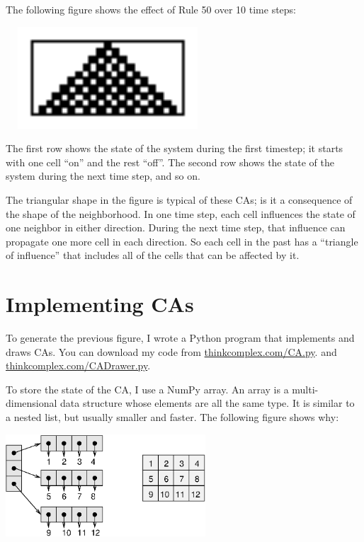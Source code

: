 \documentclass[10pt]{book}
\begin{document}
The following figure shows the effect of Rule 50 over 10
time steps:

\beforefig
\centerline{\includegraphics[width=3.0in,height=1.5in]{figs/rule50.eps}}
\afterfig

The first row shows the state of the system during the first
timestep; it starts with one cell ``on'' and the rest ``off''.
The second row shows the state of the system during the
next time step, and so on.

The triangular shape in the figure is typical of these CAs; is it a
consequence of the shape of the neighborhood.  In one time step, each
cell influences the state of one neighbor in either direction.  During
the next time step, that influence can propagate one more cell in each
direction.  So each cell in the past has a ``triangle of influence''
that includes all of the cells that can be affected by it.


\section{Implementing CAs}

To generate the previous figure, I wrote a Python program that
implements and draws CAs.
You can download my code from \url{thinkcomplex.com/CA.py}.
and \url{thinkcomplex.com/CADrawer.py}.

To store the state of the CA, I use a NumPy array.  An array is a
multi-dimensional data structure whose elements are all the same type.
It is similar to a nested list, but usually smaller and faster.  The
following figure shows why:

\beforefig
\centerline{\includegraphics[height=1.5in]{figs/array.eps}}
\afterfig
\end{document}
